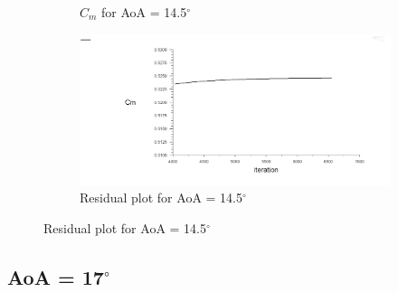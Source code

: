 \begin{figure}[H]
\begin{subfigure}[b]{0.5\textwidth}
    \caption{$C_m$ for AoA = 14.5$^\circ$}
    \label{fig:aoa_14.5_cm}
  \end{subfigure}
  \begin{subfigure}[b]{0.5\textwidth}
    \includegraphics[width=\textwidth]{14.5_deg/AoA_14_5_resid.png}
    \caption{Residual plot for AoA = 14.5$^\circ$}
    \label{fig:aoa_14.5_resid}
  \end{subfigure}
\end{figure}

\subsection*{AoA = 17$^\circ$}

